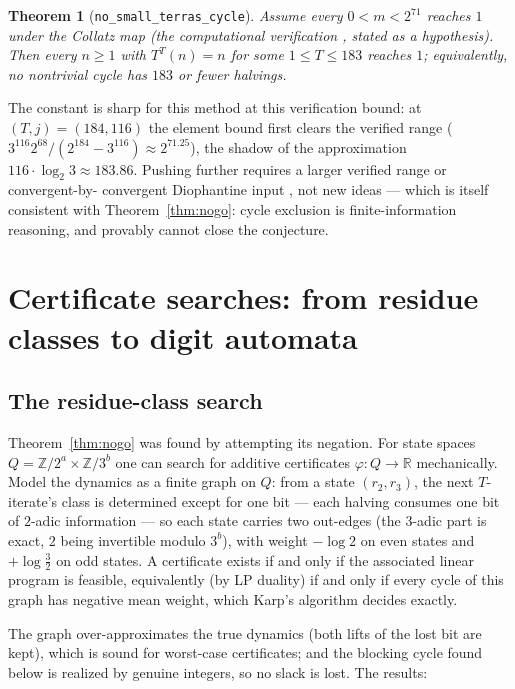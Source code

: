 \documentclass[11pt]{article}
\newtheorem{theorem}{Theorem}[section]
\newcommand{\Z}{\mathbb{Z}}
\newcommand{\code}[1]{\texttt{#1}}
\begin{document}
\begin{theorem}[\code{no\_small\_terras\_cycle}]\label{thm:nocycles}
Assume every $0 < m < 2^{71}$ reaches $1$ under the Collatz map (the
computational verification \cite{barina}, stated as a hypothesis).
Then every $n \ge 1$ with $T^T(n) = n$ for some $1 \le T \le 183$
reaches $1$; equivalently, no nontrivial cycle has $183$ or fewer
halvings.
\end{theorem}

The constant is sharp for this method at this verification bound: at
$(T, j) = (184, 116)$ the element bound first clears the verified
range ($3^{116} 2^{68}/(2^{184} - 3^{116}) \approx 2^{71.25}$), the
shadow of the approximation $116 \cdot \log_2 3 \approx 183.86$.
Pushing further requires a larger verified range or convergent-by-%
convergent Diophantine input \cite{eliahou}, not new ideas --- which
is itself consistent with Theorem~\ref{thm:nogo}: cycle exclusion is
finite-information reasoning, and provably cannot close the
conjecture.

\section{Certificate searches: from residue classes to digit automata}
\label{sec:search}

\subsection{The residue-class search}

Theorem~\ref{thm:nogo} was found by attempting its negation. For state
spaces $Q = \Z/2^a \times \Z/3^b$ one can search for additive
certificates $\varphi \colon Q \to \mathbb{R}$ mechanically. Model the
dynamics as a finite graph on $Q$: from a state $(r_2, r_3)$, the next
$T$-iterate's class is determined except for one bit --- each halving
consumes one bit of $2$-adic information --- so each state carries two
out-edges (the $3$-adic part is exact, $2$ being invertible modulo
$3^b$), with weight $-\log 2$ on even states and $+\log\frac32$ on odd
states. A certificate exists if and only if the associated linear
program is feasible, equivalently (by LP duality) if and only if every
cycle of this graph has negative mean weight, which Karp's algorithm
\cite{karp} decides exactly.

The graph over-approximates the true dynamics (both lifts of the lost
bit are kept), which is sound for worst-case certificates; and the
blocking cycle found below is realized by genuine integers, so no slack
is lost. The results:
\end{document}
